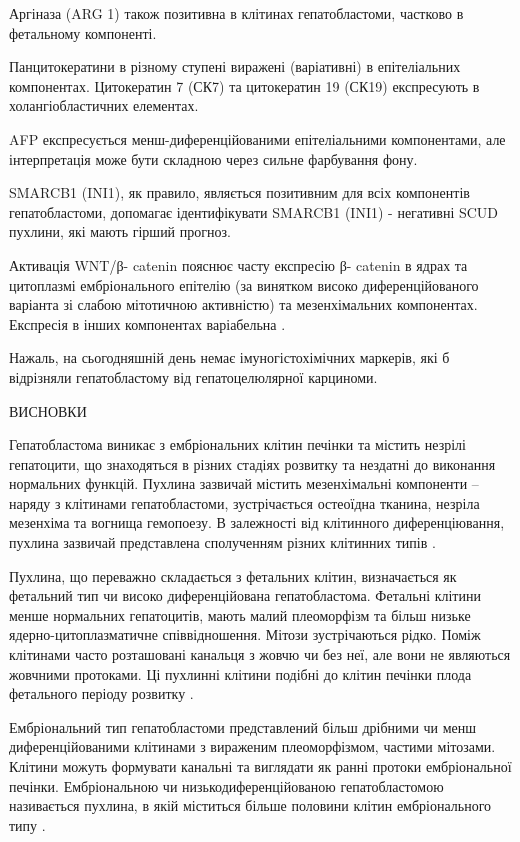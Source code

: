 Аргіназа (ARG 1) також позитивна в клітинах гепатобластоми, частково в фетальному компоненті.

Панцитокератини в різному ступені виражені (варіативні) в епітеліальних компонентах. Цитокератин 7 (СК7) та цитокератин 19 (СК19) експресують в холангіобластичних елементах.

AFP  експресується  менш-диференційованими епітеліальними компонентами,  але  інтерпретація  може бути складною через сильне фарбування фону.

SMARCB1 (INI1), як правило, являється позитивним для всіх компонентів гепатобластоми, допомагає ідентифікувати  SMARCB1 (INI1) - негативні  SCUD пухлини, які мають гірший прогноз.

Активація  WNT/β- catenin пояснює часту експресію   β- catenin в ядрах та  цитоплазмі ембріонального епітелію (за винятком  високо диференційованого варіанта зі слабою мітотичною активністю) та мезенхімальних  компонентах.  Експресія в інших компонентах варіабельна \cite{pmid18970927}.

Нажаль, на сьогодняшній день  немає імуногістохімічних маркерів, які б відрізняли гепатобластому від гепатоцелюлярної карциноми.

ВИСНОВКИ

Гепатобластома виникає з ембріональних клітин печінки та містить незрілі гепатоцити, що знаходяться в різних стадіях розвитку та нездатні до виконання нормальних функцій. Пухлина зазвичай містить мезенхімальні компоненти – наряду з клітинами гепатобластоми, зустрічається остеоїдна  тканина, незріла мезенхіма та вогнища гемопоезу. В залежності від клітинного диференціювання, пухлина зазвичай представлена сполученням різних клітинних типів \cite{pmid16123986}.

Пухлина, що переважно складається з фетальних клітин, визначається як фетальний тип чи високо диференційована гепатобластома. Фетальні клітини менше нормальних гепатоцитів, мають малий плеоморфізм та більш низьке ядерно-цитоплазматичне співвідношення. Мітози зустрічаються рідко. Поміж клітинами часто розташовані канальця з жовчю чи без неї, але вони не являються жовчними протоками. Ці пухлинні клітини подібні до клітин печінки плода фетального періоду розвитку \cite{pmid16176410}.

Ембріональний тип гепатобластоми представлений більш дрібними чи менш диференційованими клітинами з вираженим плеоморфізмом, частими мітозами. Клітини можуть формувати канальні та виглядати як ранні протоки ембріональної печінки. Ембріональною чи низькодиференційованою гепатобластомою називається пухлина, в якій міститься більше половини клітин ембріонального типу \cite{pmid11792985}.

